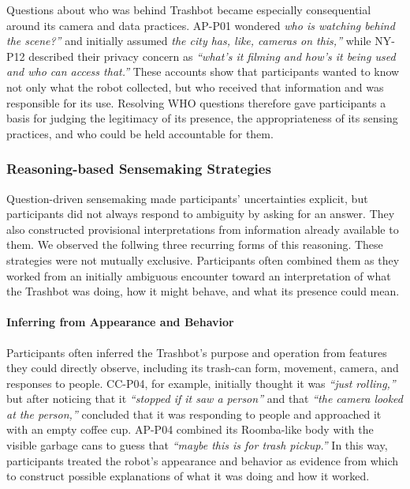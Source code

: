 Questions about who was behind Trashbot became especially consequential around its camera and data practices. AP-P01 wondered \emph{who is watching behind the scene?''} and initially assumed \emph{the city has, like, cameras on this,''} while NY-P12 described their privacy concern as \emph{``what's it filming and how's it being used and who can access that.''} These accounts show that participants wanted to know not only what the robot collected, but who received that information and was responsible for its use. Resolving WHO questions therefore gave participants a basis for judging the legitimacy of its presence, the appropriateness of its sensing practices, and who could be held accountable for them.

\subsubsection{Reasoning-based Sensemaking Strategies} 
Question-driven sensemaking made participants' uncertainties explicit, but participants did not always respond to ambiguity by asking for an answer. They also constructed provisional interpretations from information already available to them. We observed the follwing three recurring forms of this reasoning. These strategies were not mutually exclusive. Participants often combined them as they worked from an initially ambiguous encounter toward an interpretation of what the Trashbot was doing, how it might behave, and what its presence could mean.

\paragraph{Inferring from Appearance and Behavior}
Participants often inferred the Trashbot's purpose and operation from features they could directly observe, including its trash-can form, movement, camera, and responses to people. CC-P04, for example, initially thought it was \emph{``just rolling,''} but after noticing that it \emph{``stopped if it saw a person''} and that \emph{``the camera looked at the person,''} concluded that it was responding to people and approached it with an empty coffee cup. AP-P04 combined its Roomba-like body with the visible garbage cans to guess that \emph{``maybe this is for trash pickup.''} In this way, participants treated the robot's appearance and behavior as evidence from which to construct possible explanations of what it was doing and how it worked.

